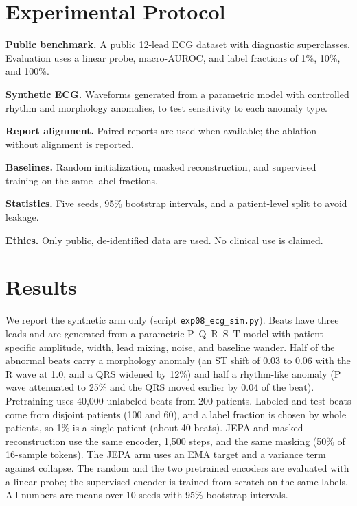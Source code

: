 \documentclass[conference]{IEEEtran}
\begin{document}
\section{Experimental Protocol}
\textbf{Public benchmark.} A public 12-lead ECG dataset with diagnostic superclasses. Evaluation uses a linear probe, macro-AUROC, and label fractions of 1\%, 10\%, and 100\%.

\textbf{Synthetic ECG.} Waveforms generated from a parametric model with controlled rhythm and morphology anomalies, to test sensitivity to each anomaly type.

\textbf{Report alignment.} Paired reports are used when available; the ablation without alignment is reported.

\textbf{Baselines.} Random initialization, masked reconstruction, and supervised training on the same label fractions.

\textbf{Statistics.} Five seeds, 95\% bootstrap intervals, and a patient-level split to avoid leakage.

\textbf{Ethics.} Only public, de-identified data are used. No clinical use is claimed.

\section{Results}
We report the synthetic arm only (script \texttt{exp08\_ecg\_sim.py}). Beats have three leads and are generated from a parametric P--Q--R--S--T model with patient-specific amplitude, width, lead mixing, noise, and baseline wander. Half of the abnormal beats carry a morphology anomaly (an ST shift of 0.03 to 0.06 with the R wave at 1.0, and a QRS widened by 12\%) and half a rhythm-like anomaly (P wave attenuated to 25\% and the QRS moved earlier by 0.04 of the beat). Pretraining uses 40{,}000 unlabeled beats from 200 patients. Labeled and test beats come from disjoint patients (100 and 60), and a label fraction is chosen by whole patients, so 1\% is a single patient (about 40 beats). JEPA and masked reconstruction use the same encoder, 1{,}500 steps, and the same masking (50\% of 16-sample tokens). The JEPA arm uses an EMA target and a variance term against collapse. The random and the two pretrained encoders are evaluated with a linear probe; the supervised encoder is trained from scratch on the same labels. All numbers are means over 10 seeds with 95\% bootstrap intervals.
\end{document}

